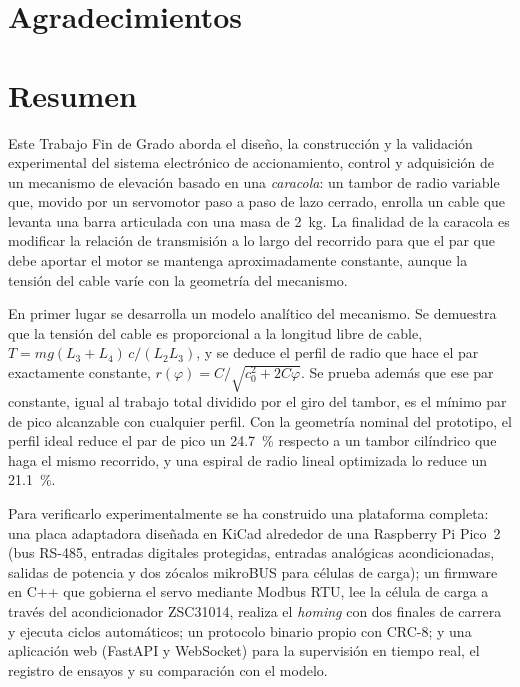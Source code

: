 \chapter*{Agradecimientos}
\thispagestyle{plain}


\cleardoublepage
\chapter*{Resumen}
\thispagestyle{plain}

Este Trabajo Fin de Grado aborda el diseño, la construcción y la validación experimental del
sistema electrónico de accionamiento, control y adquisición de un mecanismo de elevación basado
en una \emph{caracola}: un tambor de radio variable que, movido por un servomotor paso a paso de
lazo cerrado, enrolla un cable que levanta una barra articulada con una masa de \SI{2}{\kilo\gram}.
La finalidad de la caracola es modificar la relación de transmisión a lo largo del recorrido para
que el par que debe aportar el motor se mantenga aproximadamente constante, aunque la tensión del
cable varíe con la geometría del mecanismo.

En primer lugar se desarrolla un modelo analítico del mecanismo. Se demuestra que la tensión del
cable es proporcional a la longitud libre de cable, $T = mg(L_3+L_4)\,c/(L_2L_3)$, y se deduce el
perfil de radio que hace el par exactamente constante, $r(\varphi)=C/\sqrt{c_0^2+2C\varphi}$. Se
prueba además que ese par constante, igual al trabajo total dividido por el giro del tambor, es el
mínimo par de pico alcanzable con cualquier perfil. Con la geometría nominal del prototipo, el
perfil ideal reduce el par de pico un \SI{24.7}{\percent} respecto a un tambor cilíndrico que haga
el mismo recorrido, y una espiral de radio lineal optimizada lo reduce un \SI{21.1}{\percent}.

Para verificarlo experimentalmente se ha construido una plataforma completa: una placa adaptadora
diseñada en KiCad alrededor de una Raspberry Pi Pico~2 (bus RS-485, entradas digitales protegidas,
entradas analógicas acondicionadas, salidas de potencia y dos zócalos mikroBUS para células de
carga); un firmware en C++ que gobierna el servo mediante Modbus RTU, lee la célula de carga a
través del acondicionador ZSC31014, realiza el \emph{homing} con dos finales de carrera y ejecuta
ciclos automáticos; un protocolo binario propio con CRC-8; y una aplicación web (FastAPI y
WebSocket) para la supervisión en tiempo real, el registro de ensayos y su comparación con el
modelo.

